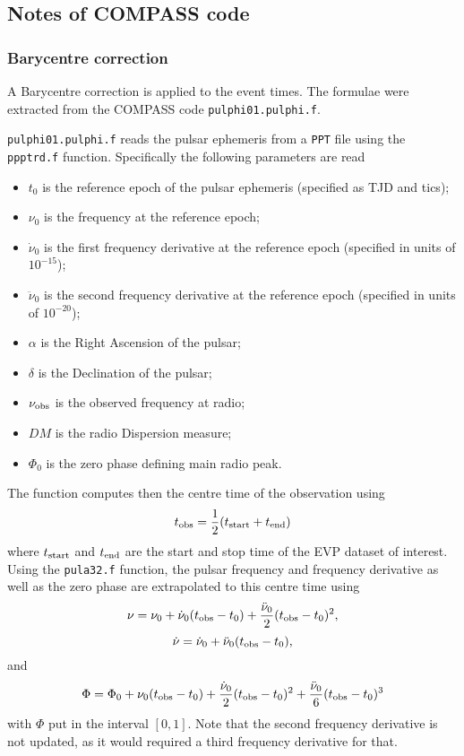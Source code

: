 \documentclass{article}[12pt,a4]
\begin{document}
\subsection{Notes of COMPASS code}

\subsubsection{Barycentre correction}

A Barycentre correction is applied to the event times. The formulae were extracted from the COMPASS
code {\tt pulphi01.pulphi.f}.

{\tt pulphi01.pulphi.f} reads the pulsar ephemeris from a {\tt PPT} file using the {\tt ppptrd.f} function. Specifically
the following parameters are read
\begin{itemize}
\item $t_0$ is the reference epoch of the pulsar ephemeris (specified as TJD and tics);
\item $\nu_0$ is the frequency at the reference epoch;
\item $\dot{\nu}_0$ is the first frequency derivative at the reference epoch (specified in units of $10^{-15}$);
\item $\ddot{\nu}_0$ is the second frequency derivative at the reference epoch (specified in units of $10^{-20}$);
\item $\alpha$ is the Right Ascension of the pulsar;
\item $\delta$ is the Declination of the pulsar;
\item $\nu_{\rm obs}$ is the observed frequency at radio;
\item $DM$ is the radio Dispersion measure;
\item $\Phi_0$ is the zero phase defining main radio peak.
\end{itemize}

The function computes then the centre time of the observation using
\begin{equation}
t_{\rm obs} = \frac{1}{2} (t_{\rm start} + t_{\rm end})
\end{equation}
where $t_{\rm start}$ and $t_{\rm end}$ are the start and stop time of the EVP dataset of
interest. 
Using the {\tt pula32.f} function, the pulsar frequency and frequency derivative as well as the zero phase
are extrapolated to this centre time using
\begin{equation}
\nu = \nu_0 + \dot{\nu}_0 (t_{\rm obs} - t_0)  + \frac{\ddot{\nu}_0}{2} (t_{\rm obs} - t_0)^2 ,
\end{equation}
\begin{equation}
\dot{\nu} = \dot{\nu}_0 + \ddot{\nu}_0 (t_{\rm obs} - t_0) ,
\end{equation}
and
\begin{equation}
\Phi = \Phi_0 + \nu_0 (t_{\rm obs} - t_0) + \frac{\dot{\nu}_0}{2} (t_{\rm obs} - t_0)^2 + \frac{\ddot{\nu}_0}{6} (t_{\rm obs} - t_0)^3
\label{eq:phase-ephemeris}
\end{equation}
with $\Phi$ put in the interval $[0,1]$.
Note that the second frequency derivative is not updated, as it would required a third frequency derivative for
that.
\end{document}
